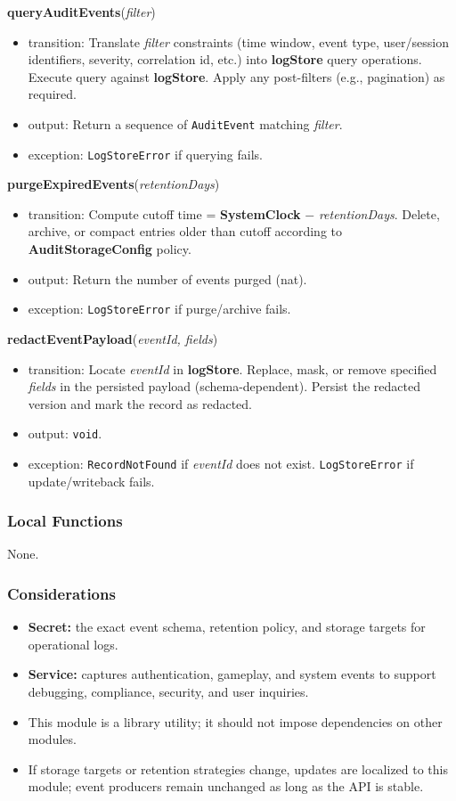 \documentclass[12pt, titlepage]{article}
\begin{document}
\noindent\textbf{queryAuditEvents}(\textit{filter})
\begin{itemize}
    \item transition: Translate \textit{filter} constraints (time window, event type, user/session identifiers, severity, correlation id, etc.) into \textbf{logStore} query operations. Execute query against \textbf{logStore}. Apply any post-filters (e.g., pagination) as required.
    \item output: Return a sequence of \texttt{AuditEvent} matching \textit{filter}.
    \item exception: \texttt{LogStoreError} if querying fails.
\end{itemize}

\noindent\textbf{purgeExpiredEvents}(\textit{retentionDays})
\begin{itemize}
    \item transition: Compute cutoff time = \textbf{SystemClock} $-$ \textit{retentionDays}. Delete, archive, or compact entries older than cutoff according to \textbf{AuditStorageConfig} policy.
    \item output: Return the number of events purged (nat).
    \item exception: \texttt{LogStoreError} if purge/archive fails.
\end{itemize}

\noindent\textbf{redactEventPayload}(\textit{eventId, fields})
\begin{itemize}
    \item transition: Locate \textit{eventId} in \textbf{logStore}. Replace, mask, or remove specified \textit{fields} in the persisted payload (schema-dependent). Persist the redacted version and mark the record as redacted.
    \item output: \texttt{void}.
    \item exception: \texttt{RecordNotFound} if \textit{eventId} does not exist. \texttt{LogStoreError} if update/writeback fails.
\end{itemize}

\subsubsection{Local Functions}
None.

\subsubsection{Considerations}
\begin{itemize}
    \item \textbf{Secret:} the exact event schema, retention policy, and storage targets for operational logs.
    \item \textbf{Service:} captures authentication, gameplay, and system events to support debugging, compliance, security, and user inquiries.
    \item This module is a library utility; it should not impose dependencies on other modules.
    \item If storage targets or retention strategies change, updates are localized to this module; event producers remain unchanged as long as the API is stable.
\end{itemize}
\end{document}
